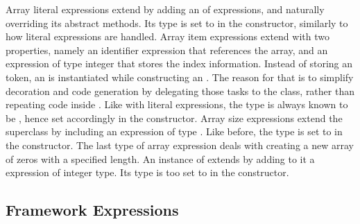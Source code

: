Array literal expressions extend  by adding an  of expressions, and naturally overriding its abstract methods. Its type is set to  in the constructor, similarly to how literal expressions are handled. Array item expressions extend  with two properties, namely an identifier expression that references the array, and an expression of type integer that stores the index information. Instead of storing an  token, an  is instantiated while constructing an . The reason for that is to simplify decoration and code generation by delegating those tasks to the  class, rather than repeating code inside . Like with literal expressions, the type is always known to be , hence set accordingly in the constructor. Array size expressions extend the superclass by including an expression of type . Like before, the type is set to  in the constructor. The last type of array expression deals with creating a new array of zeros with a specified length. An instance of  extends  by adding to it a  expression of integer type. Its type is too set to  in the constructor.

\subsection{Framework Expressions}

